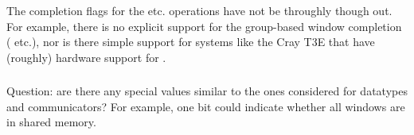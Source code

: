 \documentclass{article}
\begin{document}
The completion flags for the  etc. operations
have not be throughly though out.  For example, there is no explicit
support for the group-based window completion (
etc.), nor is there simple support for systems like the Cray T3E that
have (roughly) hardware support for .


\subsubsection{}
\subsubsection{}
\subsubsection{}

\subsubsection{}

\subsubsection{}
\subsubsection{}

\subsubsection{}
Question:  are there any special values similar to the ones considered
for datatypes and communicators?  For example, one bit could indicate
whether all windows are in shared memory.

\subsubsection{}

\subsubsection{}
\subsubsection{}
\end{document}
